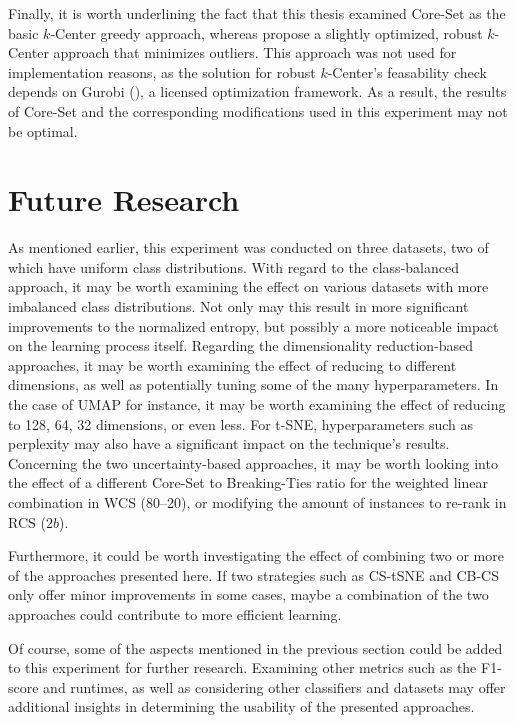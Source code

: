 \documentclass[english,bachelor,ul]{webisthesis} %
\begin{document}
Finally, it is worth underlining the fact that this thesis examined Core-Set as the basic $k$-Center greedy approach, whereas \cite{DBLP:conf/iclr/SenerS18} propose a slightly optimized, robust $k$-Center approach that minimizes outliers. This approach was not used for implementation reasons, as the solution for robust $k$-Center's feasability check depends on Gurobi (\cite{gurobi}), a licensed optimization framework. As a result, the results of Core-Set and the corresponding modifications used in this experiment may not be optimal.

\section{Future Research}

As mentioned earlier, this experiment was conducted on three datasets, two of which have uniform class distributions. With regard to the class-balanced approach, it may be worth examining the effect on various datasets with more imbalanced class distributions. Not only may this result in more significant improvements to the normalized entropy, but possibly a more noticeable impact on the learning process itself. Regarding the dimensionality reduction-based approaches, it may be worth examining the effect of reducing to different dimensions, as well as potentially tuning some of the many hyperparameters. In the case of UMAP for instance, it may be worth examining the effect of reducing to 128, 64, 32 dimensions, or even less. For t-SNE, hyperparameters such as perplexity may also have a significant impact on the technique's results. Concerning the two uncertainty-based approaches, it may be worth looking into the effect of a different Core-Set to Breaking-Ties ratio for the weighted linear combination in WCS (80--20), or modifying the amount of instances to re-rank in RCS ($2b$). 

Furthermore, it could be worth investigating the effect of combining two or more of the approaches presented here. If two strategies such as CS-tSNE and CB-CS only offer minor improvements in some cases, maybe a combination of the two approaches could contribute to more efficient learning.

Of course, some of the aspects mentioned in the previous section could be added to this experiment for further research. Examining other metrics such as the F1-score and runtimes, as well as considering other classifiers and datasets may offer additional insights in determining the usability of the presented approaches. 
\end{document}
